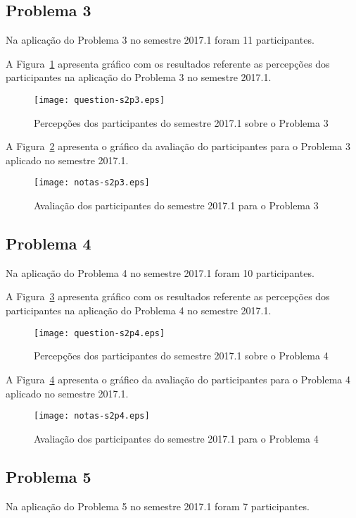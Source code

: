 \subsection{Problema 3}
Na aplicação do Problema 3 no semestre 2017.1 foram 11 participantes.

A Figura~\ref{percep-s2p3} apresenta gráfico com os resultados referente
as percepções dos participantes na aplicação do
Problema 3 no semestre 2017.1.

\begin{figure}[!htb]
\centering
\texttt{[image: question-s2p3.eps]}
\caption{Percepções dos participantes do semestre 2017.1 sobre o Problema 3}
\label{percep-s2p3}
\end{figure}

A Figura~\ref{aval-s2p3} apresenta o gráfico da
avaliação do participantes para o Problema 3 aplicado no semestre 2017.1.

\begin{figure}[!htb]
\centering
\texttt{[image: notas-s2p3.eps]}
\caption{Avaliação dos participantes do semestre 2017.1 para o Problema 3}
\label{aval-s2p3}
\end{figure}

\subsection{Problema 4}
Na aplicação do Problema 4 no semestre 2017.1 foram 10 participantes.

A Figura~\ref{percep-s2p4} apresenta gráfico com os resultados referente
as percepções dos participantes na aplicação do
Problema 4 no semestre 2017.1.

\begin{figure}[!htb]
\centering
\texttt{[image: question-s2p4.eps]}
\caption{Percepções dos participantes do semestre 2017.1 sobre o Problema 4}
\label{percep-s2p4}
\end{figure}

A Figura~\ref{aval-s2p4} apresenta o gráfico da
avaliação do participantes para o Problema 4 aplicado no semestre 2017.1.

\begin{figure}[!htb]
\centering
\texttt{[image: notas-s2p4.eps]}
\caption{Avaliação dos participantes do semestre 2017.1 para o Problema 4}
\label{aval-s2p4}
\end{figure}

\subsection{Problema 5}
Na aplicação do Problema 5 no semestre 2017.1 foram 7 participantes.

